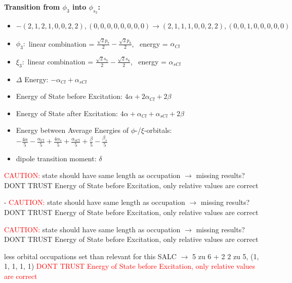 \documentclass[12pt,a4paper]{article}
\begin{document}
        \noindent\textbf{Transition from $\phi_{3}$ into $\phi_{s_{3}}$:}
        \begin{itemize}
            \item $- (2, 1, 2, 1, 0, 0, 2, 2), (0, 0, 0, 0, 0, 0, 0, 0) \rightarrow (2, 1, 1, 1, 0, 0, 2, 2), (0, 0, 1, 0, 0, 0, 0, 0)$
        
            \item $\phi_{3}:$ linear combination = $\frac{\sqrt{2} p_{7}}{2} - \frac{\sqrt{2} p_{8}}{2}$, \
            energy = $\alpha_{Cl}$
            
            \item $\xi_{3}:$ linear combination = $\frac{\sqrt{2} s_{7}}{2} - \frac{\sqrt{2} s_{8}}{2}$, \
            energy = $\alpha_{s Cl}$
            
            \item $\Delta$ Energy: $- \alpha_{Cl} + \alpha_{s Cl}$
            \item Energy of State before Excitation: $4 \alpha + 2 \alpha_{Cl} + 2 \beta$
            \item Energy of State after Excitation: $4 \alpha + \alpha_{Cl} + \alpha_{s Cl} + 2 \beta$
            \item Energy between Average Energies of $\phi$-/$\xi$-orbitals: \
            $- \frac{4 \alpha}{5} - \frac{\alpha_{Cl}}{5} + \frac{4 \alpha_{s}}{5} + \frac{\alpha_{s Cl}}{5} + \frac{\beta}{5} - \frac{\beta_{s}}{5}$
        
            \item dipole transition moment: $\delta$
        
        \end{itemize}
        
	\textcolor{red}{CAUTION:} state should have same length as occupation $\rightarrow$ missing results?
	DONT TRUST \glqq{}Energy of State before Excitation\grqq{}, only relative values are correct

 - 	\textcolor{red}{CAUTION:} state should have same length as occupation $\rightarrow$ missing results?
	DONT TRUST \glqq{}Energy of State before Excitation\grqq{}, only relative values are correct

	\textcolor{red}{CAUTION:} state should have same length as occupation $\rightarrow$ missing results?
	DONT TRUST \glqq{}Energy of State before Excitation\grqq{}, only relative values are correct

less orbital occupations set than relevant for this SALC $\rightarrow$ 
5 zu 6 + 2 
2 zu 5, (1, 1, 1, 1, 1) 
\textcolor{red}{DONT TRUST \glqq{}Energy of State before Excitation\grqq{}, only relative values are correct}
\end{document}

